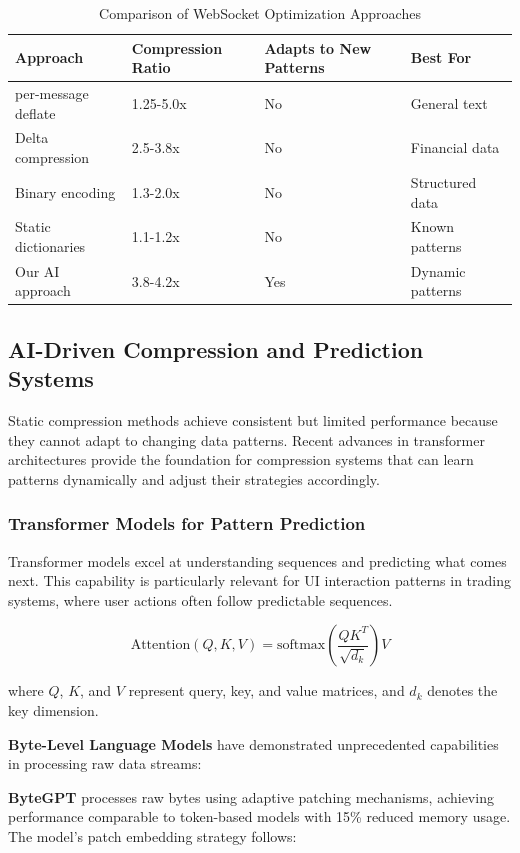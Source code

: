 \documentclass[12pt,a4paper]{article}
\begin{document}
\begin{table}[H]
\centering
\begin{tabular}{|l|l|l|l|}
\hline
\textbf{Approach} & \textbf{Compression Ratio} & \textbf{Adapts to New Patterns} & \textbf{Best For} \\
\hline
per-message deflate & 1.25-5.0x & No & General text \\
Delta compression & 2.5-3.8x & No & Financial data \\
Binary encoding & 1.3-2.0x & No & Structured data \\
Static dictionaries & 1.1-1.2x & No & Known patterns \\
Our AI approach & 3.8-4.2x & Yes & Dynamic patterns \\
\hline
\end{tabular}
\caption{Comparison of WebSocket Optimization Approaches}
\label{tab:websocket-comparison}
\end{table}

\subsection{AI-Driven Compression and Prediction Systems}

Static compression methods achieve consistent but limited performance because they cannot adapt to changing data patterns. Recent advances in transformer architectures provide the foundation for compression systems that can learn patterns dynamically and adjust their strategies accordingly.

\subsubsection{Transformer Models for Pattern Prediction}

Transformer models excel at understanding sequences and predicting what comes next. This capability is particularly relevant for UI interaction patterns in trading systems, where user actions often follow predictable sequences.

$$\text{Attention}(Q,K,V) = \text{softmax}\left(\frac{QK^T}{\sqrt{d_k}}\right)V$$

where $Q$, $K$, and $V$ represent query, key, and value matrices, and $d_k$ denotes the key dimension.

\textbf{Byte-Level Language Models} have demonstrated unprecedented capabilities in processing raw data streams:

\textbf{ByteGPT} \cite{bytegpt2023} processes raw bytes using adaptive patching mechanisms, achieving performance comparable to token-based models with 15\% reduced memory usage. The model's patch embedding strategy follows:
\end{document}
